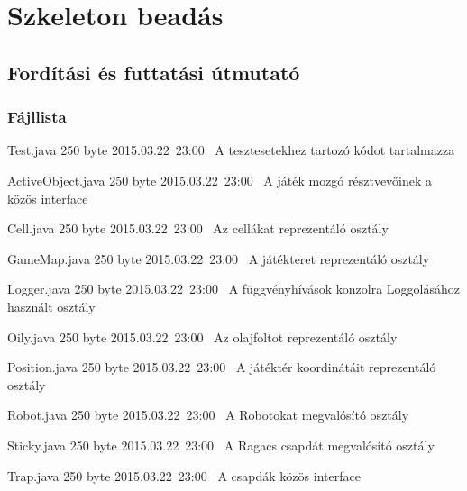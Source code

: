 %
\chapter{Szkeleton beadás}

\thispagestyle{fancy}

\section{Fordítási és futtatási útmutató}

\subsection{Fájllista}

\begin{fajllista}

\fajl
{Test.java} %
{250 byte} %
{2015.03.22~23:00~} %
{A tesztesetekhez tartozó kódot tartalmazza} %

\fajl
{ActiveObject.java} %
{250 byte} %
{2015.03.22~23:00~} %
{A játék mozgó résztvevőinek a közös interface} %

\fajl
{Cell.java} %
{250 byte} %
{2015.03.22~23:00~} %
{Az cellákat reprezentáló osztály} %

\fajl
{GameMap.java} %
{250 byte} %
{2015.03.22~23:00~} %
{A játékteret reprezentáló osztály} %

\fajl
{Logger.java} %
{250 byte} %
{2015.03.22~23:00~} %
{A függvényhívások konzolra Loggolásához használt osztály} %

\fajl
{Oily.java} %
{250 byte} %
{2015.03.22~23:00~} %
{Az olajfoltot reprezentáló osztály} %

\fajl
{Position.java} %
{250 byte} %
{2015.03.22~23:00~} %
{A játéktér koordinátáit reprezentáló osztály} %

\fajl
{Robot.java} %
{250 byte} %
{2015.03.22~23:00~} %
{A Robotokat megvalósító osztály} %

\fajl
{Sticky.java} %
{250 byte} %
{2015.03.22~23:00~} %
{A Ragacs csapdát megvalósító osztály} %

\fajl
{Trap.java} %
{250 byte} %
{2015.03.22~23:00~} %
{A csapdák közös interface} %

\end{fajllista}

